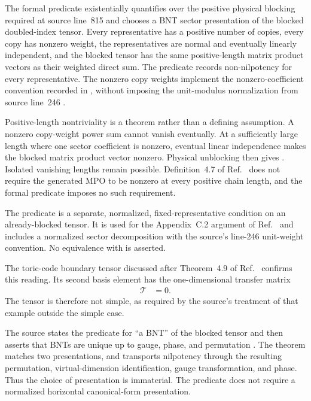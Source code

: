 \documentclass{article}
\begin{document}
The formal predicate  existentially quantifies over
the positive physical blocking required at source line~815
\cite{Cirac2016MPDO_arXiv} and chooses a BNT sector presentation of the blocked
doubled-index tensor. Every representative has a positive number of copies,
every copy has nonzero weight, the representatives are normal and eventually
linearly independent, and the blocked tensor has the same positive-length
matrix product vectors as their weighted direct sum. The predicate records
non-nilpotency for every representative. The nonzero copy weights implement
the nonzero-coefficient convention recorded in
, without
imposing the unit-modulus normalization from source line~246
\cite{Cirac2016MPDO_arXiv}.

Positive-length nontriviality is a theorem rather than a defining assumption.
A nonzero copy-weight power sum cannot vanish eventually. At a sufficiently
large length where one sector coefficient is nonzero, eventual linear
independence makes the blocked matrix product vector nonzero. Physical
unblocking then gives
. Isolated vanishing lengths
remain possible. Definition~4.7 of Ref.~\cite{Cirac2016MPDO_arXiv} does not
require the generated MPO to be nonzero at every positive chain length, and
the formal predicate imposes no such requirement.

The predicate  is a separate,
normalized, fixed-representative condition on an already-blocked tensor. It is
used for the Appendix~C.2 argument of
Ref.~\cite{Cirac2016MPDO_arXiv} and includes a normalized sector decomposition
with the source's line-246 unit-weight convention. No equivalence with
 is asserted.

The toric-code boundary tensor discussed after Theorem~4.9 of
Ref.~\cite{Cirac2016MPDO_arXiv} confirms this reading. Its second basis element
has the one-dimensional transfer matrix
\begin{align}
    \mathcal T
        &= 0.
    \label{eq:cpsvnil_toric_code_zero_transfer}
\end{align}
The tensor is therefore not simple, as required by the source's treatment of
that example outside the simple case.

The source states the predicate for ``a BNT'' of the blocked tensor and then
asserts that BNTs are unique up to gauge, phase, and permutation
\cite{Cirac2016MPDO_arXiv}. The theorem
 matches two
presentations, and
 transports nilpotency through
the resulting permutation, virtual-dimension identification, gauge
transformation, and phase. Thus the choice of presentation is immaterial. The
predicate does not require a normalized horizontal canonical-form
presentation.
\end{document}
